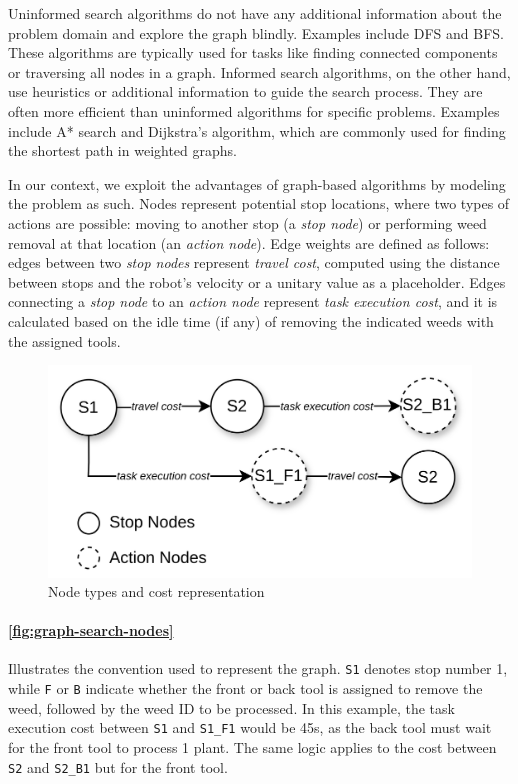 Uninformed search algorithms do not have any additional information about the problem domain and explore the graph blindly. Examples include \ac{DFS} and \ac{BFS}. These algorithms are typically used for tasks like finding connected components or traversing all nodes in a graph.
Informed search algorithms, on the other hand, use heuristics or additional information to guide the search process. They are often more efficient than uninformed algorithms for specific problems. Examples include A* search and Dijkstra's algorithm, which are commonly used for finding the shortest path in weighted graphs.

In our context, we exploit the advantages of graph-based algorithms by modeling the problem as such. Nodes represent potential stop locations, where two types of actions are possible: moving to another stop (a \textit{stop node}) or performing weed removal at that location (an \textit{action node}). Edge weights are defined as follows: edges between two \textit{stop nodes} represent \textit{travel cost}, computed using the distance between stops and the robot’s velocity or a unitary value as a placeholder. Edges connecting a \textit{stop node} to an \textit{action node} represent \textit{task execution cost}, and it is calculated based on the idle time (if any) of removing the indicated weeds with the assigned tools.

\begin{figure}[hbt]
    \centering
    \includegraphics[width=0.8\linewidth]{gfx/ch03/graph_search_nodes.png}
    \caption{Node types and cost representation}
    \label{fig:graph-search-nodes}
\end{figure}

\paragraph{\autoref{fig:graph-search-nodes}} Illustrates the convention used to represent the graph. \texttt{S1} denotes stop number 1, while \texttt{F} or \texttt{B} indicate whether the front or back tool is assigned to remove the weed, followed by the weed ID to be processed. In this example, the task execution cost between \texttt{S1} and \texttt{S1\_F1} would be 45s, as the back tool must wait for the front tool to process 1 plant. The same logic applies to the cost between \texttt{S2} and \texttt{S2\_B1} but for the front tool.

